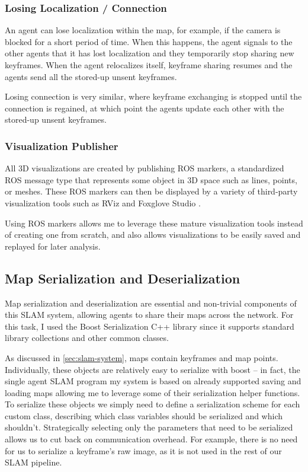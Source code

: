 \subsubsection{Losing Localization / Connection}
\label{sec:losing-localization-or-connection}
An agent can lose localization within the map, for example, if the camera is blocked for a short period of time. When this happens, the agent signals to the other agents that it has lost localization and they temporarily stop sharing new keyframes. When the agent relocalizes itself, keyframe sharing resumes and the agents send all the stored-up unsent keyframes.

Losing connection is very similar, where keyframe exchanging is stopped until the connection is regained, at which point the agents update each other with the stored-up unsent keyframes.

\subsubsection{Visualization Publisher}
\label{sec:visualization-publisher}
All 3D visualizations are created by publishing ROS markers, a standardized ROS message type that represents some object in 3D space such as lines, points, or meshes. These ROS markers can then be displayed by a variety of third-party visualization tools such as RViz \autocite{10.1007/s11235-015-0034-5} and Foxglove Studio \autocite{foxgloveStudio}.

Using ROS markers allows me to leverage these mature visualization tools instead of creating one from scratch, and also allows visualizations to be easily saved and replayed for later analysis.

\subsection{Map Serialization and Deserialization}
\label{sec:map-serialization-and-deserialization}
Map serialization and deserialization are essential and non-trivial components of this SLAM system, allowing agents to share their maps across the network. For this task, I used the Boost \autocite{boostLibrary} Serialization C++ library since it supports standard library collections and other common classes.

As discussed in \autoref{sec:slam-system}, maps contain keyframes and map points. Individually, these objects are relatively easy to serialize with boost – in fact, the single agent SLAM program my system is based on already supported saving and loading maps allowing me to leverage some of their serialization helper functions. To serialize these objects we simply need to define a serialization scheme for each custom class, describing which class variables should be serialized and which shouldn't. Strategically selecting only the parameters that need to be serialized allows us to cut back on communication overhead. For example, there is no need for us to serialize a keyframe's raw image, as it is not used in the rest of our SLAM pipeline.

